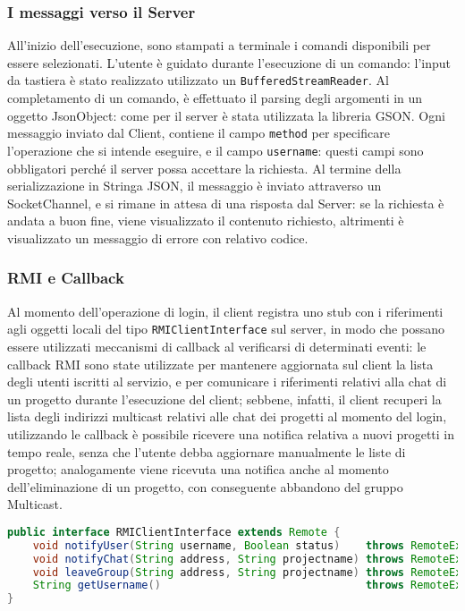 \documentclass{article}
\begin{document}
\subsubsection{I messaggi verso il Server}
All'inizio dell'esecuzione, sono stampati a terminale i comandi disponibili per essere selezionati. L'utente è guidato durante l'esecuzione di un comando: l'input da tastiera è stato realizzato utilizzato un \texttt{BufferedStreamReader}. Al completamento di un comando, è effettuato il parsing degli argomenti in un oggetto JsonObject: come per il server è stata utilizzata la libreria GSON. Ogni messaggio inviato dal Client, contiene il campo \texttt{method} per specificare l'operazione che si intende eseguire, e il campo \texttt{username}: questi campi sono obbligatori perché il server possa accettare la richiesta. Al termine della serializzazione in Stringa JSON, il messaggio è inviato attraverso un SocketChannel, e si rimane in attesa di una risposta dal Server: se la richiesta è andata a buon fine, viene visualizzato il contenuto richiesto, altrimenti è visualizzato un messaggio di errore con relativo codice.

\subsubsection{RMI e Callback}
Al momento dell'operazione di login, il client registra uno stub con i riferimenti agli oggetti locali del tipo \texttt{RMIClientInterface} sul server, in modo che possano essere utilizzati meccanismi di callback al verificarsi di determinati eventi: le callback RMI sono state utilizzate per mantenere aggiornata sul client la lista degli utenti iscritti al servizio, e per comunicare i riferimenti relativi alla chat di un progetto durante l'esecuzione del client; sebbene, infatti, il client recuperi la lista degli indirizzi multicast relativi alle chat dei progetti al momento del login, utilizzando le callback è possibile ricevere una notifica relativa a nuovi progetti in tempo reale, senza che l'utente debba aggiornare manualmente le liste di progetto; analogamente viene ricevuta una notifica anche al momento dell'eliminazione di un progetto, con conseguente abbandono del gruppo Multicast.\newline

\begin{lstlisting}[language=Java, caption=Interfaccia \texttt{RMIClientInterface.java}]
public interface RMIClientInterface extends Remote {
    void notifyUser(String username, Boolean status)    throws RemoteException;
    void notifyChat(String address, String projectname) throws RemoteException;
    void leaveGroup(String address, String projectname) throws RemoteException;
    String getUsername()                                throws RemoteException;
}
\end{lstlisting}
\end{document}
